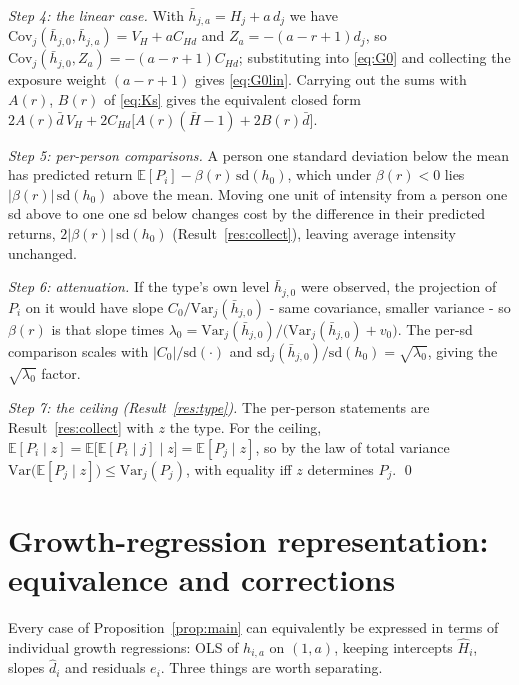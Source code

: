 \documentclass[11pt]{article}
\theoremstyle{remark}
\newcommand{\E}{\mathbb{E}}
\newcommand{\Var}{\mathrm{Var}}
\newcommand{\Cov}{\mathrm{Cov}}
\begin{document}
\emph{Step 4: the linear case.} With $\bar h_{j,a}=H_j+a\,d_j$ we have $\Cov_j(\bar h_{j,0},\bar h_{j,a})=V_H+aC_{Hd}$ and $Z_a=-(a-r+1)d_j$, so $\Cov_j(\bar h_{j,0},Z_a)=-(a-r+1)C_{Hd}$; substituting into \eqref{eq:G0} and collecting the exposure weight $(a-r+1)$ gives \eqref{eq:G0lin}.
Carrying out the sums with $A(r)$, $B(r)$ of \eqref{eq:Ks} gives the equivalent closed form $2A(r)\bar d\,V_H+2C_{Hd}\bigl[A(r)(\bar H-1)+2B(r)\bar d\bigr]$.

\emph{Step 5: per-person comparisons.} A person one standard deviation below the mean has predicted return $\E[P_i]-\beta(r)\,\mathrm{sd}(h_0)$, which under $\beta(r)<0$ lies $|\beta(r)|\,\mathrm{sd}(h_0)$ above the mean.
Moving one unit of intensity from a person one sd above to one one sd below changes cost by the difference in their predicted returns, $2|\beta(r)|\,\mathrm{sd}(h_0)$ (Result~\ref{res:collect}), leaving average intensity unchanged.

\emph{Step 6: attenuation.} If the type's own level $\bar h_{j,0}$ were observed, the projection of $P_i$ on it would have slope $C_0/\Var_j(\bar h_{j,0})$ - same covariance, smaller variance - so $\beta(r)$ is that slope times $\lambda_0=\Var_j(\bar h_{j,0})/\bigl(\Var_j(\bar h_{j,0})+v_0\bigr)$.
The per-sd comparison scales with $|C_0|/\mathrm{sd}(\cdot)$ and $\mathrm{sd}_j(\bar h_{j,0})/\mathrm{sd}(h_0)=\sqrt{\lambda_0}$, giving the $\sqrt{\lambda_0}$ factor.

\emph{Step 7: the ceiling (Result~\ref{res:type}).} The per-person statements are Result~\ref{res:collect} with $z$ the type.
For the ceiling, $\E[P_i\mid z] =\E\bigl[\E[P_i\mid j]\mid z\bigr]=\E[P_j\mid z]$, so by the law of total variance $\Var\bigl(\E[P_j\mid z]\bigr)\le\Var_j(P_j)$, with equality iff $z$ determines $P_j$.
\qed

\section{Growth-regression representation: equivalence and corrections}\label{app:growth}

Every case of Proposition~\ref{prop:main} can equivalently be expressed in terms of individual growth regressions: OLS of $h_{i,a}$ on $(1,a)$, keeping intercepts $\hat H_i$, slopes $\hat d_i$ and residuals $e_i$.
Three things are worth separating.
\end{document}
